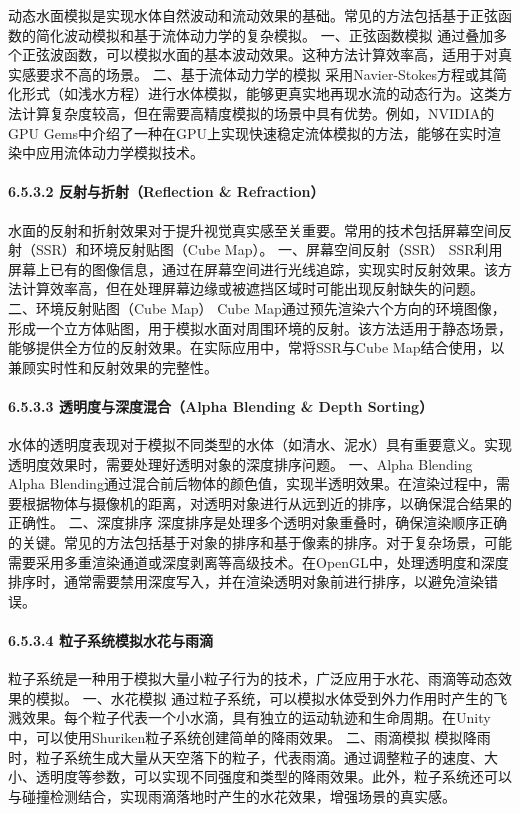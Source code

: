 动态水面模拟是实现水体自然波动和流动效果的基础。常见的方法包括基于正弦函数的简化波动模拟和基于流体动力学的复杂模拟。 一、正弦函数模拟 通过叠加多个正弦波函数，可以模拟水面的基本波动效果。这种方法计算效率高，适用于对真实感要求不高的场景。 二、基于流体动力学的模拟 采用Navier-Stokes方程或其简化形式（如浅水方程）进行水体模拟，能够更真实地再现水流的动态行为。这类方法计算复杂度较高，但在需要高精度模拟的场景中具有优势。例如，NVIDIA的GPU Gems中介绍了一种在GPU上实现快速稳定流体模拟的方法，能够在实时渲染中应用流体动力学模拟技术。 \paragraph{6.5.3.2 反射与折射（Reflection \& Refraction）}\label{ux53cdux5c04ux4e0eux6298ux5c04reflection-refraction} 水面的反射和折射效果对于提升视觉真实感至关重要。常用的技术包括屏幕空间反射（SSR）和环境反射贴图（Cube Map）。 一、屏幕空间反射（SSR） SSR利用屏幕上已有的图像信息，通过在屏幕空间进行光线追踪，实现实时反射效果。该方法计算效率高，但在处理屏幕边缘或被遮挡区域时可能出现反射缺失的问题。 二、环境反射贴图（Cube Map） Cube Map通过预先渲染六个方向的环境图像，形成一个立方体贴图，用于模拟水面对周围环境的反射。该方法适用于静态场景，能够提供全方位的反射效果。在实际应用中，常将SSR与Cube Map结合使用，以兼顾实时性和反射效果的完整性。 \paragraph{6.5.3.3 透明度与深度混合（Alpha Blending \& Depth Sorting）}\label{ux900fux660eux5ea6ux4e0eux6df1ux5ea6ux6df7ux5408alpha-blending-depth-sorting} 水体的透明度表现对于模拟不同类型的水体（如清水、泥水）具有重要意义。实现透明度效果时，需要处理好透明对象的深度排序问题。 一、Alpha Blending Alpha Blending通过混合前后物体的颜色值，实现半透明效果。在渲染过程中，需要根据物体与摄像机的距离，对透明对象进行从远到近的排序，以确保混合结果的正确性。 二、深度排序 深度排序是处理多个透明对象重叠时，确保渲染顺序正确的关键。常见的方法包括基于对象的排序和基于像素的排序。对于复杂场景，可能需要采用多重渲染通道或深度剥离等高级技术。在OpenGL中，处理透明度和深度排序时，通常需要禁用深度写入，并在渲染透明对象前进行排序，以避免渲染错误。 \paragraph{6.5.3.4 粒子系统模拟水花与雨滴}\label{ux7c92ux5b50ux7cfbux7edfux6a21ux62dfux6c34ux82b1ux4e0eux96e8ux6ef4} 粒子系统是一种用于模拟大量小粒子行为的技术，广泛应用于水花、雨滴等动态效果的模拟。 一、水花模拟 通过粒子系统，可以模拟水体受到外力作用时产生的飞溅效果。每个粒子代表一个小水滴，具有独立的运动轨迹和生命周期。在Unity中，可以使用Shuriken粒子系统创建简单的降雨效果。 二、雨滴模拟 模拟降雨时，粒子系统生成大量从天空落下的粒子，代表雨滴。通过调整粒子的速度、大小、透明度等参数，可以实现不同强度和类型的降雨效果。此外，粒子系统还可以与碰撞检测结合，实现雨滴落地时产生的水花效果，增强场景的真实感。 